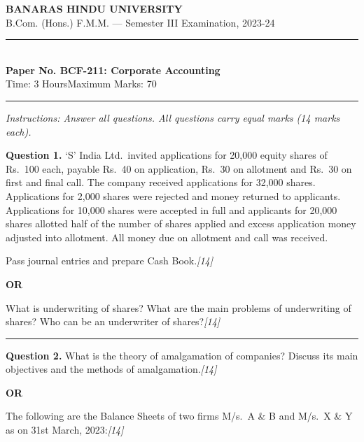 \documentclass[11pt,a4paper]{article}
\newcommand{\pts}[1]{\hfill   \textit{[#1]}}
\begin{document}
\begin{center}
  {\large\bfseries BANARAS HINDU UNIVERSITY}\\[2pt]
  {\normalsize B.Com. (Hons.) F.M.M. --- Semester III Examination, 2023-24}\\[6pt]
  \rule{0.8\linewidth}{0.5pt}\\[6pt]
  {\large\bfseries Paper No. BCF-211: Corporate Accounting}\\[4pt]
  {\normalsize Time: 3 Hours\hfill Maximum Marks: 70}
\end{center}

\rule{\linewidth}{0.4pt}

\smallskip



\noindent   \textit{Instructions: Answer all questions. All questions carry equal marks (14 marks each).}

\bigskip




\noindent   \textbf{Question 1.}
`S' India Ltd.\ invited applications for 20,000 equity shares of Rs.\ 100 each, payable Rs.\ 40 on application, Rs.\ 30 on allotment and Rs.\ 30 on first and final call. The company received applications for 32,000 shares. Applications for 2,000 shares were rejected and money returned to applicants. Applications for 10,000 shares were accepted in full and applicants for 20,000 shares allotted half of the number of shares applied and excess application money adjusted into allotment. All money due on allotment and call was received.

Pass journal entries and prepare Cash Book.\pts{14}

\centerline{   \textbf{OR}}

What is underwriting of shares? What are the main problems of underwriting of shares? Who can be an underwriter of shares?\pts{14}

\medskip\rule{\linewidth}{0.2pt}




\noindent   \textbf{Question 2.}
What is the theory of amalgamation of companies? Discuss its main objectives and the methods of amalgamation.\pts{14}

\centerline{   \textbf{OR}}

The following are the Balance Sheets of two firms M/s.\ A \& B and M/s.\ X \& Y as on 31st March, 2023:\pts{14}
\end{document}
